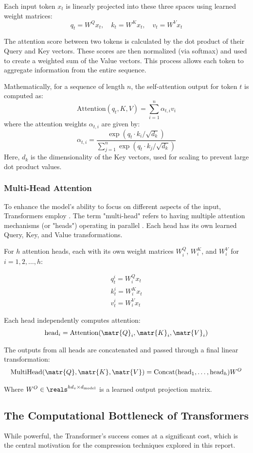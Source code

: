 Each input token $x_t$ is linearly projected into these three spaces using learned weight matrices:
\[
q_t = W^Q x_t, \quad k_t = W^K x_t, \quad v_t = W^V x_t
\]

The attention score between two tokens is calculated by the dot product of their Query and Key vectors. These scores are then normalized (via softmax) and used to create a weighted sum of the Value vectors. This process allows each token to aggregate information from the entire sequence.

Mathematically, for a sequence of length $n$, the self-attention output for token $t$ is computed as:
\[
\text{Attention}(q_t, K, V) = \sum_{i=1}^{n} \alpha_{t,i} v_i
\]
where the attention weights $\alpha_{t,i}$ are given by:
\[
\alpha_{t,i} = \frac{\exp(q_t \cdot k_i / \sqrt{d_k})}{\sum_{j=1}^{n} \exp(q_t \cdot k_j / \sqrt{d_k})}
\]
Here, $d_k$ is the dimensionality of the Key vectors, used for scaling to prevent large dot product values.

\subsubsection{Multi-Head Attention}
To enhance the model's ability to focus on different aspects of the input, Transformers employ .
The term "multi-head" refers to having multiple attention mechanisms (or "heads") operating in parallel \cite{vaswani2017attention}. Each head has its own learned Query, Key, and Value transformations.

For $h$ attention heads, each with its own weight matrices $W_i^Q$, $W_i^K$, and $W_i^V$ for $i = 1, 2, \ldots, h$:

\begin{gather*}
  q_t^i = W_i^Q x_t\\
  k_t^i = W_i^K x_t\\
  v_t^i = W_i^V x_t
\end{gather*}

Each head independently computes attention:
\[
  \text{head}_i = \text{Attention}(\matr{Q}_i, \matr{K}_i, \matr{V}_i)
\]

The outputs from all heads are concatenated and passed through a final linear transformation:
\[
  \text{MultiHead}(\matr{Q}, \matr{K}, \matr{V}) = \text{Concat}(\text{head}_1, \ldots, \text{head}_h) W^O
\]

Where $W^O \in \reals^{hd_v \times d_{\text{model}}}$ is a learned output projection matrix.


\subsection{The Computational Bottleneck of Transformers}
\label{sec:transformer_bottleneck}
While powerful, the Transformer's success comes at a significant cost, which is the central motivation for the compression techniques explored in this report.

